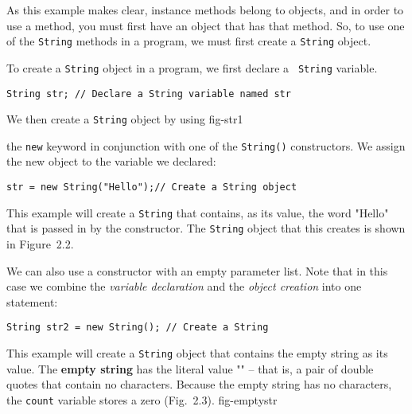 As this example makes clear, instance methods belong to objects, and
in order to use a method, you must first have an object that has that
method. So, to use one of the {\tt String} methods in a program, we must
first create a {\tt String} object. 

To create a {\tt String} object in a program, we first declare a {\tt
String} variable.

\begin{jjjlisting}
\begin{lstlisting}
String str; // Declare a String variable named str
\end{lstlisting}
\end{jjjlisting}

\noindent We then create a {\tt String} object by using
{fig-str1}

the {\tt new} keyword in conjunction with one of the {\tt String()}
constructors. We assign the new object to the variable we declared:

\begin{jjjlisting}
\begin{lstlisting}
str = new String("Hello");// Create a String object
\end{lstlisting}
\end{jjjlisting}

\noindent This example will create a {\tt String} that
contains, as its value, the word "Hello" that is passed in by the
constructor.  The {\tt String} object that this creates is shown in
Figure~2.2.


We can also use a constructor with an empty parameter list.
Note that in this case we combine the {\it variable declaration}
and the {\it object creation} into one statement:

\begin{jjjlisting}
\begin{lstlisting}
String str2 = new String(); // Create a String
\end{lstlisting}
\end{jjjlisting}

\noindent This example will create a {\tt String} object
that contains the empty string as its value.  The {\bf empty string}
has the literal value "" -- that is, a pair of double quotes that
contain no characters. Because the empty string has no characters,
the {\tt count} variable stores a zero (Fig.~2.3).
{fig-emptystr}


